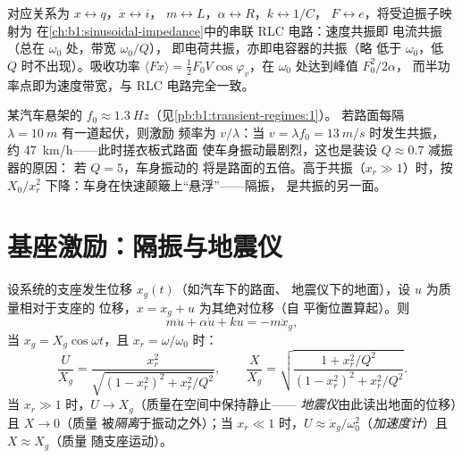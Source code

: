 \begin{remark}\label{rem:b1:oscillators-resonance:analogy}
对应关系为 $x \leftrightarrow q$，$\dot x \leftrightarrow i$，
$m \leftrightarrow L$，$\alpha \leftrightarrow R$，$k \leftrightarrow 1/C$，
$F \leftrightarrow e$，将受迫振子映射为
在\cref{ch:b1:sinusoidal-impedance}中的串联 RLC 电路：速度共振即
电流共振（总在 $\omega_0$ 处，带宽 $\omega_0/Q$），
即电荷共振，亦即电容器的共振（略
低于 $\omega_0$，低 $Q$ 时不出现）。吸收功率 $\langle F\dot x\rangle
= \tfrac12 F_0V\cos\varphi_v$，在 $\omega_0$ 处达到峰值 $F_0^2/2\alpha$，
而半功率点即为速度带宽，与
RLC 电路完全一致。
\end{remark}

\begin{example}[共振速率]\label{ex:b1:oscillators-resonance:road}
某汽车悬架的 $f_0 \approx \qty{1.3}{Hz}$（见\cref{pb:b1:transient-regimes:1}）。
若路面每隔 $\lambda = \qty{10}{m}$ 有一道起伏，则激励
频率为 $v/\lambda$：当 $v = \lambda f_0 = \qty{13}{m/s}$ 时发生共振，
约 \qty{47}{km/h}——此时搓衣板式路面
使车身振动最剧烈，这也是装设 $Q \approx 0.7$ 减振器的原因：
若 $Q = 5$，车身振动的
将是路面的五倍。高于共振（$x_r \gg 1$）时，按
$X_0/x_r^2$ 下降：车身在快速颠簸上“悬浮”——隔振，
是共振的另一面。
\end{example}

\section{基座激励：隔振与地震仪}

\begin{proposition}[由支座带动的振子]\label{prop:b1:oscillators-resonance:base}
设系统的支座发生位移 $x_g(t)$（如汽车下的路面、
地震仪下的地面），设 $u$ 为质量相对于支座的
位移，$x = x_g + u$ 为其绝对位移（自
平衡位置算起）。则
\[
m\ddot u + \alpha\dot u + ku = -m\ddot x_g ,
\]
当 $x_g = X_g\cos\omega t$，且 $x_r = \omega/\omega_0$ 时：
\[
\frac{U}{X_g} = \frac{x_r^2}{\sqrt{(1 - x_r^2)^2 + x_r^2/Q^2}},
\qquad
\frac{X}{X_g} = \sqrt{\frac{1 + x_r^2/Q^2}{(1 - x_r^2)^2 + x_r^2/Q^2}} .
\]
当 $x_r \gg 1$ 时，$U \to X_g$（质量在空间中保持静止——
\emph{地震仪}由此读出地面的位移）且 $X \to 0$（质量
被\emph{隔离}于振动之外）；当 $x_r \ll 1$ 时，$U \approx
\ddot x_g/\omega_0^2$（\emph{加速度计}）且 $X \approx X_g$（质量
随支座运动）。
\end{proposition}

